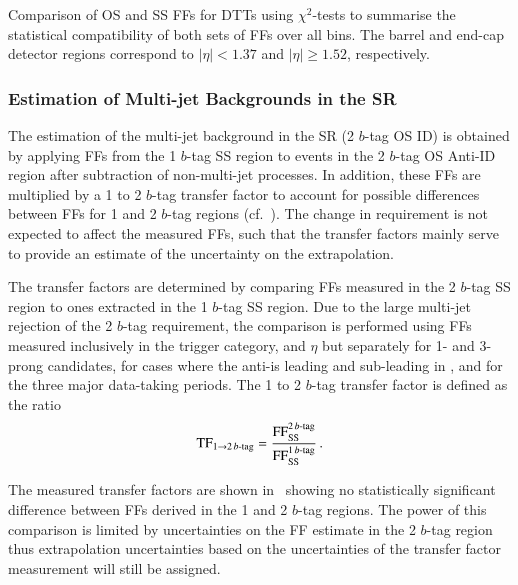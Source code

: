 \begin{table}[htbp]
  \centering

  \caption{Comparison of OS and SS FFs for DTTs using $\chi^2$-tests to
    summarise the statistical compatibility of both sets of FFs over all
    \tauhadvis \pT bins. The barrel and end-cap detector regions correspond to
    \tauhadvis $|\eta| < 1.37$ and $|\eta| \geq 1.52$, respectively.}%
  \label{tab:fake_factor_osss_chi2test}

  
\end{table}


\subsubsection{Estimation of Multi-jet Backgrounds in the \hadhad SR}

The estimation of the multi-jet background in the \hadhad SR (2 $b$-tag OS ID)
is obtained by applying FFs from the 1 $b$-tag SS region to events in the 2
$b$-tag OS Anti-ID region after subtraction of non-multi-jet processes. In
addition, these FFs are multiplied by a 1 to 2 $b$-tag transfer factor to
account for possible differences between FFs for 1 and 2 $b$-tag regions (cf.\
). The change in \btag requirement is not expected
to affect the measured FFs, such that the transfer factors mainly serve to
provide an estimate of the uncertainty on the extrapolation.

The transfer factors are determined by comparing FFs measured in the 2 $b$-tag
SS region to ones extracted in the 1 $b$-tag SS region. Due to the large
multi-jet rejection of the 2 $b$-tag requirement, the comparison is performed
using FFs measured inclusively in the trigger category, \tauhadvis \pT and
\tauhadvis $\eta$ but separately for 1- and 3-prong \tauhadvis candidates, for
cases where the anti-\tauhadvis is leading and sub-leading in \pT, and for the
three major data-taking periods. The 1 to 2 $b$-tag transfer factor is defined
as the ratio
\begin{align*}
  \text{TF}_{1 \rightarrow 2\,b\text{-tag}} = \frac{\text{FF}_{\text{SS}}^{2\,b\text{-tag}}}{\text{FF}_{\text{SS}}^{1\,b\text{-tag}}} \,\text{.}
\end{align*}

The measured transfer factors are shown in~
showing no statistically significant difference between FFs derived in the 1 and
2 $b$-tag regions. The power of this comparison is limited by uncertainties on
the FF estimate in the 2 $b$-tag region thus extrapolation uncertainties based
on the uncertainties of the transfer factor measurement will still be assigned.

